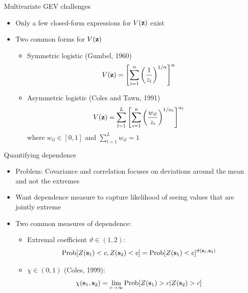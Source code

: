 \documentclass{beamer}
\begin{document}
\begin{frame}{Multivariate GEV challenges}
	\begin{itemize} \setlength{\itemsep}{1em}
		\item Only a few closed-form expressions for $V(\mathbf{z})$ exist
		\item Two common forms for $V(\mathbf{z})$
		\begin{itemize}
			\item Symmetric logistic (Gumbel, 1960)
			\begin{align*}
				V(\mathbf{z}) = \left[\sum_{i = 1}^n \left( \frac{ 1 }{ z_i } \right)^{1/\alpha}\right]^\alpha
			\end{align*}
			\item Asymmetric logistic (Coles and Tawn, 1991)
			\begin{align*}
				V(\mathbf{z}) = \sum_{l = 1}^L \left[\sum_{i = 1}^n \left(\frac{w_{il}}{z_i} \right)^{1 / \alpha_l} \right]^{\alpha_l}
			\end{align*}
			where $w_{il} \in [0, 1]$ and $\sum_{l = 1}^L w_{il} = 1$
		\end{itemize}
	\end{itemize}
\end{frame}


\begin{frame}{Quantifying dependence}
	\begin{itemize}\setlength{\itemsep}{1em}
		\item \alert{Problem}: Covariance and correlation focuses on deviations around the mean and not the extremes
		\item Want dependence measure to capture likelihood of seeing values that are jointly extreme
		\item Two common measures of dependence:
		\begin{itemize}\setlength{\itemsep}{0.5em}
			\item Extremal coefficient $\vartheta \in (1, 2)$: $$\mbox{Prob}[Z(\mathbf{s}_1)<c, Z(\mathbf{s}_2)<c] = \mbox{Prob}[Z(\mathbf{s}_1)<c]^{\vartheta(\mathbf{s}_1,\mathbf{s}_2)}$$
			\item $\chi \in (0, 1)$ (Coles, 1999): $$\chi(\mathbf{s}_1,\mathbf{s}_2) = \lim_{c\rightarrow \infty}\mbox{Prob}[Z(\mathbf{s}_1)>c|Z(\mathbf{s}_2)>c]$$
		\end{itemize}
	\end{itemize}
\end{frame}
\end{document}
